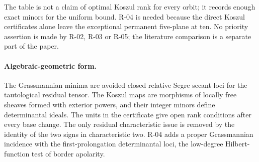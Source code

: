 The table is not a claim of optimal Koszul rank for every
orbit; it records enough exact minors for the uniform
bound. R-04 is needed because the direct Koszul certificates
alone leave the exceptional permanent five-plane at ten.
No priority assertion is made by R-02, R-03 or R-05;
the literature comparison is a separate part of the paper.

\paragraph{Algebraic-geometric form.}
The Grassmannian minima are avoided closed relative Segre
secant loci for the tautological residual tensor.
The Koszul maps are morphisms of locally free sheaves
formed with exterior powers, and their integer minors
define determinantal ideals. The units in the certificate
give open rank conditions after every base change.
The only residual characteristic issue is removed by the
identity of the two signs in characteristic two.
R-04 adds a proper Grassmannian incidence with the
first-prolongation determinantal loci, the low-degree
Hilbert-function test of border apolarity.
